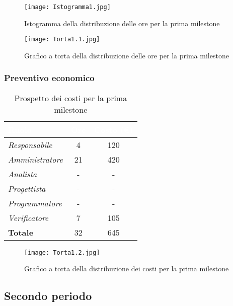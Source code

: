 \begin{figure}[H]
    \texttt{[image: Istogramma1.jpg]}
    \caption{Istogramma della distribuzione delle ore per la prima milestone}
\end{figure}

\begin{figure}[H]
    \texttt{[image: Torta1.1.jpg]}
    \caption{Grafico a torta della distribuzione delle ore per la prima milestone}
\end{figure}

\newpage
\subsubsection{Preventivo economico}

\begin{table}[H]
    \renewcommand\arraystretch{1.5}
    \centering
    \begin{tabular}{|l|c|c|}
    \hline
    \rowcolor[HTML]{036400}
    \textcolor{white}{\textbf{Ruolo}} & \multicolumn{1}{l|}{\textcolor{white}{\textbf{Ore}}} & \multicolumn{1}{l|}{\textcolor{white}{\textbf{Costo (€)}}} \\ \hline
    \rowcolor[HTML]{EFEFEF}\textit{Responsabile} & 4 & 120 \\ \hline
    \rowcolor[HTML]{C0C0C0}\textit{Amministratore} & 21 & 420 \\ \hline
    \rowcolor[HTML]{EFEFEF}\textit{Analista} & - & - \\ \hline
    \rowcolor[HTML]{C0C0C0}\textit{Progettista} & - & - \\ \hline
    \rowcolor[HTML]{EFEFEF}\textit{Programmatore} & - & - \\ \hline
    \rowcolor[HTML]{C0C0C0}\textit{Verificatore} & 7 & 105 \\ \hline
    \rowcolor[HTML]{EFEFEF}\textbf{Totale} & 32 & 645 \\ \hline
    \end{tabular}
    \caption{Prospetto dei costi per la prima milestone}
\end{table}

\begin{figure}[H]
    \texttt{[image: Torta1.2.jpg]}
    \caption{Grafico a torta della distribuzione dei costi per la prima milestone}
\end{figure}

\newpage
\subsection{Secondo periodo}

